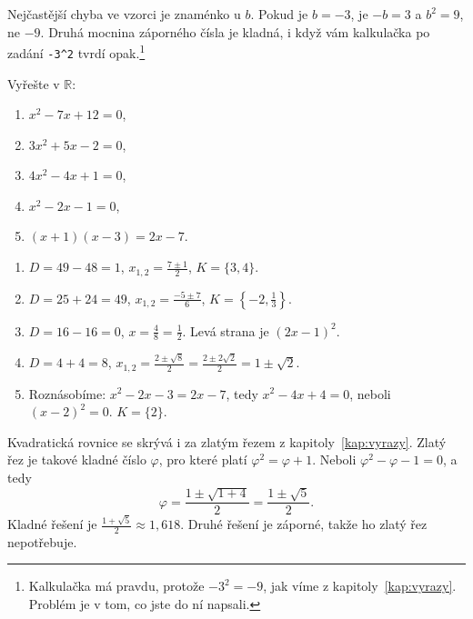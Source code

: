 \begin{note}
  Nejčastější chyba ve vzorci je znaménko u $b$. Pokud je $b = -3$, je $-b = 3$ a $b^2 = 9$, ne $-9$. Druhá mocnina záporného čísla je kladná, i když vám kalkulačka po zadání \texttt{-3\^{}2} tvrdí opak.\footnote{Kalkulačka má pravdu, protože $-3^2 = -9$, jak víme z kapitoly~\ref{kap:vyrazy}. Problém je v tom, co jste do ní napsali.}
\end{note}

\begin{problem}
  Vyřešte v $\mathbb{R}$:
  \begin{enumerate}[label=(\alph*)]
    \item $x^2 - 7x + 12 = 0$,
    \item $3x^2 + 5x - 2 = 0$,
    \item $4x^2 - 4x + 1 = 0$,
    \item $x^2 - 2x - 1 = 0$,
    \item $(x + 1)(x - 3) = 2x - 7$.
  \end{enumerate}
\end{problem}

\begin{solution}
  \begin{enumerate}[label=(\alph*)]
    \item $D = 49 - 48 = 1$, $x_{1,2} = \frac{7\pm 1}{2}$, $K = \{3, 4\}$.
    \item $D = 25 + 24 = 49$, $x_{1,2} = \frac{-5\pm 7}{6}$, $K = \left\{-2, \frac{1}{3}\right\}$.
    \item $D = 16 - 16 = 0$, $x = \frac{4}{8} = \frac{1}{2}$. Levá strana je ${(2x - 1)}^2$.
    \item $D = 4 + 4 = 8$, $x_{1,2} = \frac{2\pm\sqrt{8}}{2} = \frac{2\pm 2\sqrt{2}}{2} = 1\pm\sqrt{2}$.
    \item Roznásobíme: $x^2 - 2x - 3 = 2x - 7$, tedy $x^2 - 4x + 4 = 0$, neboli ${(x - 2)}^2 = 0$. $K = \{2\}$.
  \end{enumerate}
\end{solution}

\begin{example}
  Kvadratická rovnice se skrývá i za zlatým řezem z kapitoly~\ref{kap:vyrazy}. Zlatý řez je takové kladné číslo $\varphi$, pro které platí $\varphi^2 = \varphi + 1$. Neboli $\varphi^2 - \varphi - 1 = 0$, a tedy
  \begin{equation*}
    \varphi = \frac{1\pm\sqrt{1 + 4}}{2} = \frac{1\pm\sqrt{5}}{2}.
  \end{equation*}
  Kladné řešení je $\frac{1 + \sqrt{5}}{2}\approx 1{,}618$. Druhé řešení je záporné, takže ho zlatý řez nepotřebuje.
\end{example}

